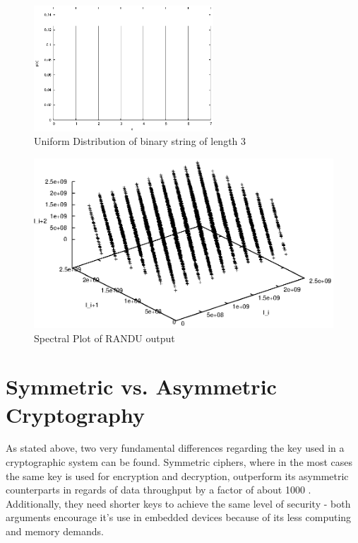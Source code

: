 \begin{figure}
    \centering
    \includegraphics[width=0.6\textwidth]{figures/uniform}
    \caption{Uniform Distribution of binary string of length 3}
    \label{fig:uniform}
\end{figure}

\begin{figure}
    \centering
    \includegraphics[width=1\textwidth]{figures/randu}
    \caption{Spectral Plot of RANDU output}
    \label{fig:randu}
\end{figure}


\section{Symmetric vs. Asymmetric Cryptography}

As stated above, two very fundamental differences regarding the key used in a cryptographic system can be found. Symmetric ciphers, where in the most cases
the same key is used for encryption and decryption, outperform its asymmetric counterparts in regards of data throughput by a factor of about 1000 \cite{5412055}.
Additionally, they need shorter keys to achieve the same level of security - both arguments encourage it's use in embedded devices because of its less computing
and memory demands.

